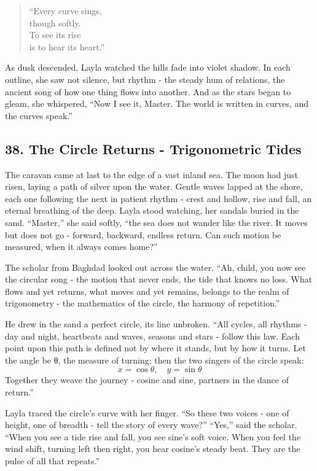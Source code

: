 \documentclass[
  letterpaper,
  DIV=11,
  numbers=noendperiod]{scrreprt}
\begin{document}
\begin{quote}
``Every curve sings,\\
though softly.\\
To see its rise\\
is to hear its heart.''
\end{quote}

As dusk descended, Layla watched the hills fade into violet shadow. In
each outline, she saw not silence, but rhythm - the steady hum of
relations, the ancient song of how one thing flows into another. And as
the stars began to gleam, she whispered, ``Now I see it, Master. The
world is written in curves, and the curves speak.''

\subsection{38. The Circle Returns - Trigonometric
Tides}\label{the-circle-returns---trigonometric-tides}

The caravan came at last to the edge of a vast inland sea. The moon had
just risen, laying a path of silver upon the water. Gentle waves lapped
at the shore, each one following the next in patient rhythm - crest and
hollow, rise and fall, an eternal breathing of the deep. Layla stood
watching, her sandals buried in the sand. ``Master,'' she said softly,
``the sea does not wander like the river. It moves but does not go -
forward, backward, endless return. Can such motion be measured, when it
always comes home?''

The scholar from Baghdad looked out across the water. ``Ah, child, you
now see the circular song - the motion that never ends, the tide that
knows no loss. What flows and yet returns, what moves and yet remains,
belongs to the realm of trigonometry - the mathematics of the circle,
the harmony of repetition.''

He drew in the sand a perfect circle, its line unbroken. ``All cycles,
all rhythms - day and night, heartbeats and waves, seasons and stars -
follow this law. Each point upon this path is defined not by where it
stands, but by how it turns. Let the angle be θ, the measure of turning;
then the two singers of the circle speak: \[
x = \cos θ, \quad y = \sin θ
\] Together they weave the journey - cosine and sine, partners in the
dance of return.''

Layla traced the circle's curve with her finger. ``So these two voices -
one of height, one of breadth - tell the story of every wave?'' ``Yes,''
said the scholar. ``When you see a tide rise and fall, you see sine's
soft voice. When you feel the wind shift, turning left then right, you
hear cosine's steady beat. They are the pulse of all that repeats.''
\end{document}
